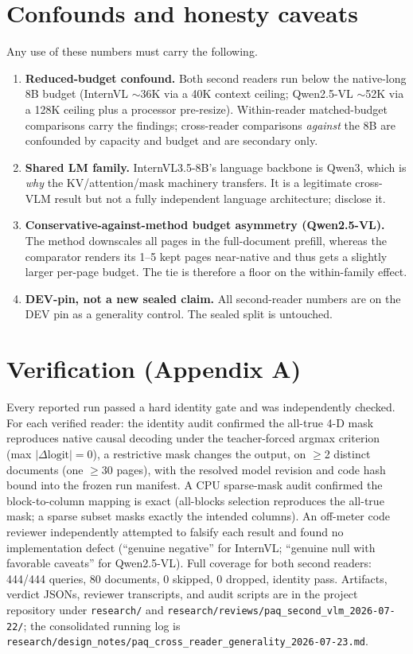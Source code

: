 \documentclass[letterpaper]{article} %
\begin{document}
\section{Confounds and honesty caveats}
\label{sec:confounds}
Any use of these numbers must carry the following.
\begin{enumerate}
\item \textbf{Reduced-budget confound.} Both second readers run below the native-long 8B budget (InternVL $\sim$36K via
a 40K context ceiling; Qwen2.5-VL $\sim$52K via a 128K ceiling plus a processor pre-resize). Within-reader
matched-budget comparisons carry the findings; cross-reader comparisons \emph{against} the 8B are confounded by
capacity and budget and are secondary only.
\item \textbf{Shared LM family.} InternVL3.5-8B's language backbone is Qwen3, which is \emph{why} the KV/attention/mask
machinery transfers. It is a legitimate cross-VLM result but not a fully independent language architecture; disclose it.
\item \textbf{Conservative-against-method budget asymmetry (Qwen2.5-VL).} The method downscales all pages in the
full-document prefill, whereas the comparator renders its 1--5 kept pages near-native and thus gets a slightly larger
per-page budget. The tie is therefore a floor on the within-family effect.
\item \textbf{DEV-pin, not a new sealed claim.} All second-reader numbers are on the DEV pin as a generality control.
The sealed split is untouched.
\end{enumerate}

\section*{Verification (Appendix A)}
\label{sec:verification}
Every reported run passed a hard identity gate and was independently checked. For each verified reader: the identity
audit confirmed the all-true 4-D mask reproduces native causal decoding under the teacher-forced argmax criterion
(max $|\Delta\text{logit}|=0$), a restrictive mask changes the output, on $\geq$2 distinct documents (one $\geq$30
pages), with the resolved model revision and code hash bound into the frozen run manifest. A CPU sparse-mask audit
confirmed the block-to-column mapping is exact (all-blocks selection reproduces the all-true mask; a sparse subset
masks exactly the intended columns). An off-meter code reviewer independently attempted to falsify each result and
found no implementation defect (``genuine negative'' for InternVL; ``genuine null with favorable caveats'' for
Qwen2.5-VL). Full coverage for both second readers: 444/444 queries, 80 documents, 0 skipped, 0 dropped, identity pass.
Artifacts, verdict JSONs, reviewer transcripts, and audit scripts are in the project repository under
\texttt{research/} and \texttt{research/reviews/paq\_second\_vlm\_2026-07-22/}; the consolidated running log is
\texttt{research/design\_notes/paq\_cross\_reader\_generality\_2026-07-23.md}.
\end{document}
